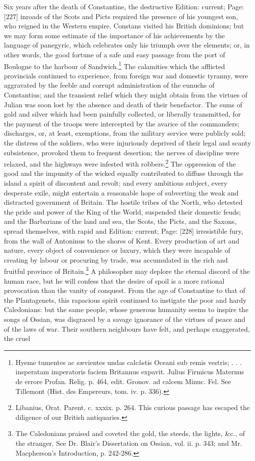 Six years after the death of Constantine, the destructive Edition: current; Page: [227] inroads of the Scots and Picts required the presence of his youngest son, who reigned in the Western empire. Constans visited his British dominions; but we may form some estimate of the importance of his achievements by the language of panegyric, which celebrates only his triumph over the elements; or, in other words, the good fortune of a safe and easy passage from the port of Boulogne to the harbour of Sandwich.\footnote{Hyeme tumentes ac sævientes undas calcâstis Oceani sub remis vestris; . . . insperatam imperatoris faciem Britannus expavit. Julius Firmicus Maternus de errore Profan. Relig. p. 464, edit. Gronov. ad calcem Minuc. Fel. See Tillemont (Hist. des Empereurs, tom. iv. p. 336).} The calamities which the afflicted provincials continued to experience, from foreign war and domestic tyranny, were aggravated by the feeble and corrupt administration of the eunuchs of Constantius; and the transient relief which they might obtain from the virtues of Julian was soon lost by the absence and death of their benefactor. The sums of gold and silver which had been painfully collected, or liberally transmitted, for the payment of the troops were intercepted by the avarice of the commanders; discharges, or, at least, exemptions, from the military service were publicly sold; the distress of the soldiers, who were injuriously deprived of their legal and scanty subsistence, provoked them to frequent desertion; the nerves of discipline were relaxed, and the highways were infested with robbers.\footnote{Libanius, Orat. Parent. c. xxxix. p. 264. This curious passage has escaped the diligence of our British antiquaries.} The oppression of the good and the impunity of the wicked equally contributed to diffuse through the island a spirit of discontent and revolt; and every ambitious subject, every desperate exile, might entertain a reasonable hope of subverting the weak and distracted government of Britain. The hostile tribes of the North, who detested the pride and power of the King of the World, suspended their domestic feuds; and the Barbarians of the land and sea, the Scots, the Picts, and the Saxons, spread themselves, with rapid and Edition: current; Page: [228] irresistible fury, from the wall of Antoninus to the shores of Kent. Every production of art and nature, every object of convenience or luxury, which they were incapable of creating by labour or procuring by trade, was accumulated in the rich and fruitful province of Britain.\footnote{The Caledonians praised and coveted the gold, the steeds, the lights, \&c., of the stranger. See Dr. Blair\texthebrew{}’s Dissertation on Ossian, vol. ii. p. 343; and Mr. Macpherson\texthebrew{}’s Introduction, p. 242-286.} A philosopher may deplore the eternal discord of the human race, but he will confess that the desire of spoil is a more rational provocation than the vanity of conquest. From the age of Constantine to that of the Plantagenets, this rapacious spirit continued to instigate the poor and hardy Caledonians: but the same people, whose generous humanity seems to inspire the songs of Ossian, was disgraced by a savage ignorance of the virtues of peace and of the laws of war. Their southern neighbours have felt, and perhaps exaggerated, the cruel 